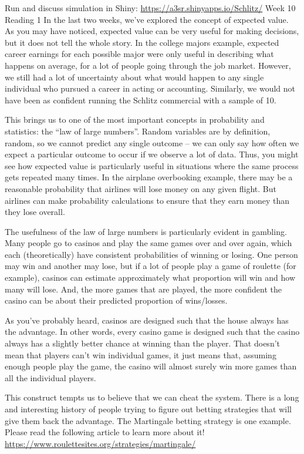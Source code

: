 \documentclass[]{book}
\begin{document}
Run and discuss simulation in Shiny: \url{https://a3sr.shinyapps.io/Schlitz/}
Week 10 Reading 1
In the last two weeks, we've explored the concept of expected value. As you may have noticed, expected value can be very useful for making decisions, but it does not tell the whole story. In the college majors example, expected career earnings for each possible major were only useful in describing what happens on average, for a lot of people going through the job market. However, we still had a lot of uncertainty about what would happen to any single individual who pursued a career in acting or accounting. Similarly, we would not have been as confident running the Schlitz commercial with a sample of 10.

This brings us to one of the most important concepts in probability and statistics: the ``law of large numbers''. Random variables are by definition, random, so we cannot predict any single outcome -- we can only say how often we expect a particular outcome to occur if we observe a lot of data. Thus, you might see how expected value is particularly useful in situations where the same process gets repeated many times. In the airplane overbooking example, there may be a reasonable probability that airlines will lose money on any given flight. But airlines can make probability calculations to ensure that they earn money than they lose overall.

The usefulness of the law of large numbers is particularly evident in gambling. Many people go to casinos and play the same games over and over again, which each (theoretically) have consistent probabilities of winning or losing. One person may win and another may lose, but if a lot of people play a game of roulette (for example), casinos can estimate approximately what proportion will win and how many will lose. And, the more games that are played, the more confident the casino can be about their predicted proportion of wins/losses.

As you've probably heard, casinos are designed such that the house always has the advantage. In other words, every casino game is designed such that the casino always has a slightly better chance at winning than the player. That doesn't mean that players can't win individual games, it just means that, assuming enough people play the game, the casino will almost surely win more games than all the individual players.

This construct tempts us to believe that we can cheat the system. There is a long and interesting history of people trying to figure out betting strategies that will give them back the advantage. The Martingale betting strategy is one example. Please read the following article to learn more about it! \url{https://www.roulettesites.org/strategies/martingale/}
\end{document}
